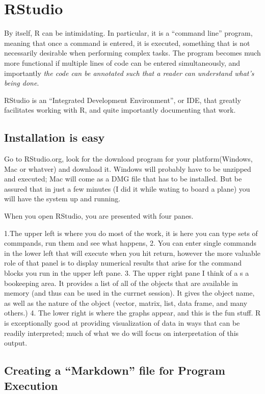 \documentclass[]{tufte-book}
\begin{document}
\chapter{RStudio}\label{rstudio}

By itself, R can be intimidating. In particular, it is a ``command
line'' program, meaning that once a command is entered, it is executed,
something that is not necessarily desirable when performing complex
tasks. The program becomes much more functional if multiple lines of
code can be entered simultaneously, and importantly \emph{the code can
be annotated such that a reader can understand what's being done}.

RStudio is an ``Integrated Development Environment'', or IDE, that
greatly facilitates working with R, and quite importantly documenting
that work.

\section{Installation is easy}\label{installation-is-easy}

Go to RStudio.org, look for the download program for your
platform(Windows, Mac or whatver) and download it. Windows will probably
have to be unzipped and executed; Mac will come as a DMG file that has
to be installed. But be assured that in just a few minutes (I did it
while wating to board a plane) you will have the system up and running.

When you open RStudio, you are presented with four panes.

1.The upper left is where you do most of the work, it is here you can
type sets of commpands, run them and see what happens, 2. You can enter
single commands in the lower left that will execute when you hit return,
however the more valuable role of that panel is to display numerical
results that arise for the command blocks you run in the upper left
pane. 3. The upper right pane I think of a s a bookeeping area. It
provides a list of all of the objects that are available in memory (and
thus can be used in the currnet session). It gives the object name, as
well as the nature of the object (vector, matrix, list, data frame, and
many others.) 4. The lower right is where the graphs appear, and this is
the fun stuff. R is exceptionally good at providing visualization of
data in ways that can be readily interpreted; much of what we do will
focus on interpretation of this output.

\section{\texorpdfstring{Creating a ``Markdown'' file for Program
Execution}{Creating a Markdown file for Program Execution}}\label{creating-a-markdown-file-for-program-execution}
\end{document}
